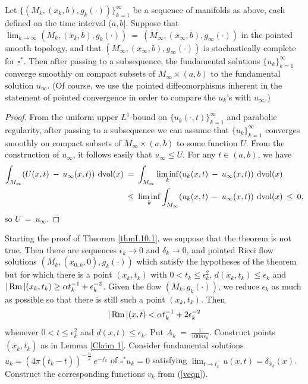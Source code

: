\begin{lemma}
  \label{lem:kl-upper-bound-integral-integral-bound-pseudolocality}
 \label{stoccomplete}
Let $\{(M_k, (\overline{x}_k, b), g_k(\cdot)) \}_{k=1}^\infty$ be a
sequence of
manifolds as above,
each defined on the time interval
$(a,b]$.
Suppose that $\lim_{k \rightarrow \infty}
(M_k, (\overline{x}_k, b), g_k(\cdot)) \: = \:
(M_\infty, (\overline{x}_\infty, b), g_\infty(\cdot))$
in the pointed smooth topology, and that
$(M_\infty, (\overline{x}_\infty, b), g_\infty(\cdot))$
is stochastically complete for $\square^*$.
Then after passing to a subsequence,
the fundamental solutions $\{ u_k \}_{k=1}^\infty$ converge smoothly
on compact subsets of $M_\infty \times (a,b)$ to the fundamental
solution $u_\infty$.
(Of course, we use the
pointed diffeomorphisms inherent in the statement of pointed convergence
in order to compare the $u_k$'s with $u_\infty$.)
\end{lemma}
\begin{proof}
From the uniform upper $L^1$-bound on $\{ u_k(\cdot, t) \}_{k=1}^\infty$
and parabolic
regularity, after passing to a subsequence we can assume that
$\{ u_k\}_{k=1}^\infty$ converges smoothly on compact subsets of
$M_\infty \times (a,b)$ to some function $U$. From the construction of
$u_\infty$, it follows easily that $u_\infty \le U$. For any
$t \in (a,b)$, we have
\begin{align}
\int_{M_\infty} ( U(x,t) \: - \: u_\infty(x,t) ) \: \operatorname{dvol}(x) \: & = \:
\int_{M_\infty} \liminf_k ( u_k(x, t) \: - \: u_\infty(x,t) ) \: \operatorname{dvol}(x) \\
& \le \: \liminf_k \int_{M_\infty} ( u_k(x, t) \: - \: u_\infty(x,t) ) \:
\operatorname{dvol}(x) \: \le \: 0, \notag
\end{align}
so $U \: = \: u_\infty$.
\end{proof}


Starting the proof of Theorem \ref{thmI.10.1}, we suppose that the
theorem is not true. Then there are
sequences $\epsilon_k \rightarrow 0$ and
$\delta_k \rightarrow 0$, and
pointed Ricci flow solutions $(M_k, (x_{0,k}, 0), g_k(\cdot))$
which
satisfy the hypotheses of the theorem but for which there is a point
$(x_k, t_k)$ with $0 < t_k \le \epsilon_k^2$,
$d(x_k, t_k) \le \epsilon_k$
and
$|\operatorname{Rm}|(x_k, t_k) \geq \alpha t_k^{-1} + \epsilon_k^{-2}$.
Given the flow $(M_k, g_k(\cdot))$, we reduce $\epsilon_k$ as much as
possible so that there is still such a point $(x_k, t_k)$. Then
\begin{equation} \label{largebound}
|\operatorname{Rm}|(x, t) < \alpha t_k^{-1} + 2\epsilon_k^{-2}
\end{equation}
whenever
$0 < t \le \epsilon_k^2$ and
$d(x, t) \le \epsilon_k$.
Put $A_k \: = \: \frac{1}{100n\epsilon_k}$. Construct points
$(\overline{x}_k, \overline{t}_k)$ as in Lemma \ref{Claim 1}.
Consider fundamental
solutions $u_k = (4\pi(\overline{t}_k - t))^{- \: \frac{n}{2}} \:
e^{-f_k}$ of $\square^* u_k = 0$ satisfying
$\lim_{t \rightarrow \overline{t}_k^-} u(x, t) = \delta_{\overline{x}_k}(x)$.
Construct the corresponding functions
$v_k$ from (\ref{veqn}).

